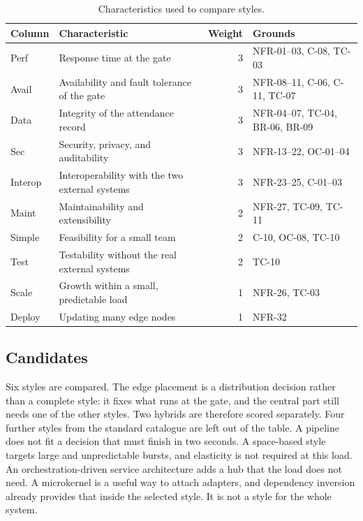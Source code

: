 \begin{table}[ht]
\centering
\caption{Characteristics used to compare styles.}
\label{tab:weights}
\small
\begin{tabularx}{\textwidth}{@{}lXrl@{}}
\toprule
\textbf{Column} & \textbf{Characteristic} & \textbf{Weight} & \textbf{Grounds}\\
\midrule
Perf & Response time at the gate & 3 & NFR-01--03, C-08, TC-03\\
Avail & Availability and fault tolerance of the gate & 3 & NFR-08--11, C-06, C-11, TC-07\\
Data & Integrity of the attendance record & 3 & NFR-04--07, TC-04, BR-06, BR-09\\
Sec & Security, privacy, and auditability & 3 & NFR-13--22, OC-01--04\\
Interop & Interoperability with the two external systems & 3 & NFR-23--25, C-01--03\\
Maint & Maintainability and extensibility & 2 & NFR-27, TC-09, TC-11\\
Simple & Feasibility for a small team & 2 & C-10, OC-08, TC-10\\
Test & Testability without the real external systems & 2 & TC-10\\
Scale & Growth within a small, predictable load & 1 & NFR-26, TC-03\\
Deploy & Updating many edge nodes & 1 & NFR-32\\
\bottomrule
\end{tabularx}
\end{table}

\subsection{Candidates}

Six styles are compared.
The edge placement is a distribution decision rather than a complete style: it fixes what runs at the gate, and the central part still needs one of the other styles.
Two hybrids are therefore scored separately.
Four further styles from the standard catalogue are left out of the table.
A pipeline does not fit a decision that must finish in two seconds.
A space-based style targets large and unpredictable bursts, and elasticity is not required at this load.
An orchestration-driven service architecture adds a hub that the load does not need.
A microkernel is a useful way to attach adapters, and dependency inversion already provides that inside the selected style.
It is not a style for the whole system.

